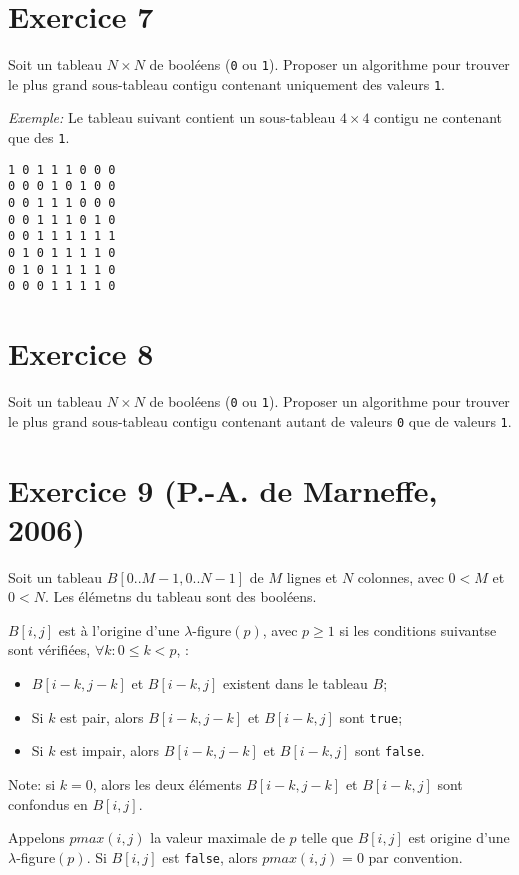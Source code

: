 \documentclass[a4paper,10pt]{article}
\begin{document}
\section*{Exercice 7}

Soit un tableau $N \times N$ de booléens (\texttt{0} ou \texttt{1}). Proposer un algorithme pour trouver le plus grand sous-tableau contigu contenant uniquement des valeurs \texttt{1}.

\textit{Exemple:} Le tableau suivant contient un sous-tableau $4 \times 4$ contigu ne contenant que des \texttt{1}.

\begin{verbatim}
1 0 1 1 1 0 0 0
0 0 0 1 0 1 0 0
0 0 1 1 1 0 0 0
0 0 1 1 1 0 1 0
0 0 1 1 1 1 1 1
0 1 0 1 1 1 1 0
0 1 0 1 1 1 1 0
0 0 0 1 1 1 1 0
\end{verbatim}


\section*{Exercice 8}

Soit un tableau $N \times N$ de booléens (\texttt{0} ou \texttt{1}). Proposer un algorithme pour trouver le plus grand sous-tableau contigu contenant autant de valeurs \texttt{0} que de valeurs \texttt{1}.


\section*{Exercice 9 (P.-A. de Marneffe, 2006)}

Soit un tableau $B[0..M-1, 0..N-1]$ de $M$ lignes et $N$ colonnes, avec $0<M$ et
$0<N$. Les élémetns du tableau sont des booléens.

$B[i,j]$ est à l'origine d'une $\lambda$-figure$(p)$, avec $p\geq 1$ si les conditions suivantse sont vérifiées, $\forall k : 0 \leq k < p$, :

\begin{itemize}
\item $B[i-k,j-k]$ et $B[i-k,j]$ existent dans le tableau $B$;
\item Si $k$ est pair, alors $B[i-k,j-k]$ et $B[i-k,j]$ sont \texttt{true};
\item Si $k$ est impair, alors $B[i-k,j-k]$ et $B[i-k,j]$ sont \texttt{false}.
\end{itemize}

Note: si $k=0$, alors les deux éléments $B[i-k,j-k]$ et $B[i-k,j]$ sont confondus en $B[i,j]$.

Appelons $pmax(i,j)$ la valeur maximale de $p$ telle que $B[i,j]$ est origine d'une $\lambda$-figure$(p)$. Si $B[i,j]$ est \texttt{false}, alors $pmax(i,j)=0$ par convention.
\end{document}
